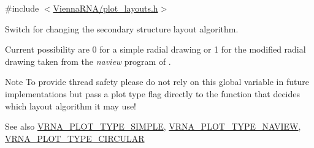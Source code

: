{\ttfamily \#include $<$\mbox{\hyperlink{plot__layouts_8h}{Vienna\+R\+N\+A/plot\+\_\+layouts.\+h}}$>$}



Switch for changing the secondary structure layout algorithm. 

Current possibility are 0 for a simple radial drawing or 1 for the modified radial drawing taken from the {\itshape naview} program of \cite{bruccoleri:1988}.

\begin{DoxyNote}{Note}
To provide thread safety please do not rely on this global variable in future implementations but pass a plot type flag directly to the function that decides which layout algorithm it may use!
\end{DoxyNote}
\begin{DoxySeeAlso}{See also}
\mbox{\hyperlink{group__plotting__utils_gae6d17b9f0a53cf5205a9181e0f8422e9}{V\+R\+N\+A\+\_\+\+P\+L\+O\+T\+\_\+\+T\+Y\+P\+E\+\_\+\+S\+I\+M\+P\+LE}}, \mbox{\hyperlink{group__plotting__utils_ga94d4c863ecac2f220f76658afb92f964}{V\+R\+N\+A\+\_\+\+P\+L\+O\+T\+\_\+\+T\+Y\+P\+E\+\_\+\+N\+A\+V\+I\+EW}}, \mbox{\hyperlink{group__plotting__utils_ga8c9eac631348da92136c8363ecdd9fb9}{V\+R\+N\+A\+\_\+\+P\+L\+O\+T\+\_\+\+T\+Y\+P\+E\+\_\+\+C\+I\+R\+C\+U\+L\+AR}} 
\end{DoxySeeAlso}
